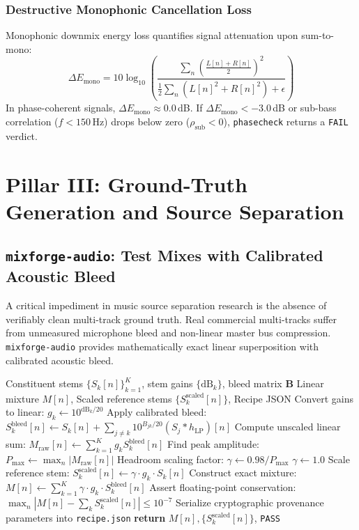 \documentclass[10pt,journal,compsoc]{IEEEtran}
\begin{document}
\subsubsection{Destructive Monophonic Cancellation Loss}
Monophonic downmix energy loss quantifies signal attenuation upon sum-to-mono:
\begin{equation}
\Delta E_{\text{mono}} = 10 \log_{10} \left( \frac{\sum_n \left( \frac{L[n] + R[n]}{2} \right)^2}{\frac{1}{2} \sum_n (L[n]^2 + R[n]^2) + \epsilon} \right)
\label{eq:mono_loss}
\end{equation}
In phase-coherent signals, $\Delta E_{\text{mono}} \approx 0.0$\,dB. If $\Delta E_{\text{mono}} < -3.0$\,dB or sub-bass correlation ($f < 150$\,Hz) drops below zero ($\rho_{\text{sub}} < 0$), \texttt{phasecheck} returns a \texttt{FAIL} verdict.

\section{Pillar III: Ground-Truth Generation and Source Separation}

\subsection{\texttt{mixforge-audio}: Test Mixes with Calibrated Acoustic Bleed}
A critical impediment in music source separation research is the absence of verifiably clean multi-track ground truth. Real commercial multi-tracks suffer from unmeasured microphone bleed and non-linear master bus compression. \texttt{mixforge-audio} provides mathematically exact linear superposition with calibrated acoustic bleed.

\begin{algorithm}[t]
\caption{\texttt{mixforge-audio}: Exact Linear Superposition Mix}
\label{alg:mixforge}
\begin{algorithmic}[1]
\REQUIRE Constituent stems $\{S_k[n]\}_{k=1}^K$, stem gains $\{\text{dB}_k\}$, bleed matrix $\mathbf{B}$
\ENSURE Linear mixture $M[n]$, Scaled reference stems $\{S_k^{\text{scaled}}[n]\}$, Recipe JSON
\STATE Convert gains to linear: $g_k \leftarrow 10^{\text{dB}_k / 20}$
\STATE Apply calibrated bleed: $S_k^{\text{bleed}}[n] \leftarrow S_k[n] + \sum_{j \ne k} 10^{B_{jk}/20} (S_j * h_{\text{LP}})[n]$
\STATE Compute unscaled linear sum: $M_{\text{raw}}[n] \leftarrow \sum_{k=1}^K g_k S_k^{\text{bleed}}[n]$
\STATE Find peak amplitude: $P_{\max} \leftarrow \max_n |M_{\text{raw}}[n]|$
    \STATE Headroom scaling factor: $\gamma \leftarrow 0.98 / P_{\max}$
\ELSE
    \STATE $\gamma \leftarrow 1.0$
\ENDIF
{}
    \STATE Scale reference stem: $S_k^{\text{scaled}}[n] \leftarrow \gamma \cdot g_k \cdot S_k[n]$
\ENDFOR
\STATE Construct exact mixture: $M[n] \leftarrow \sum_{k=1}^K \gamma \cdot g_k \cdot S_k^{\text{bleed}}[n]$
\STATE Assert floating-point conservation: $\max_n |M[n] - \sum_k S_k^{\text{scaled}}[n]| \le 10^{-7}$
\STATE Serialize cryptographic provenance parameters into \texttt{recipe.json}
\STATE \textbf{return} $M[n], \{S_k^{\text{scaled}}[n]\}$, \texttt{PASS}
\end{algorithmic}
\end{algorithm}
\end{document}
